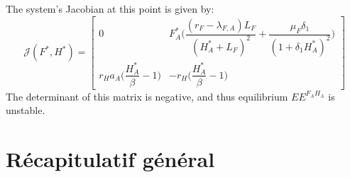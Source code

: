 \documentclass{article}
\newcommand{\lfa}{\lambda_{F, A}}
\begin{document}
The system's Jacobian at this point is given by:
\begin{equation*}
\mathcal{J}(F^*, H^*) = \begin{bmatrix}
0 & F^*_A \Big(\dfrac{(r_F - \lfa) L_F}{(H^*_A + L_F)^2} + \dfrac{\mu_F \delta_1}{(1+\delta_1H^*_A)^2} \Big) \\
r_H a_A \Big(\dfrac{H^*_A}{\beta} - 1\Big) & -r_H \Big(\dfrac{H^*_A}{\beta} - 1\Big)
\end{bmatrix}
\end{equation*}
The determinant of this matrix is negative, and thus equilibrium $EE^{F_AH_A}$ is unstable.


\section{Récapitulatif général}
\end{document}
